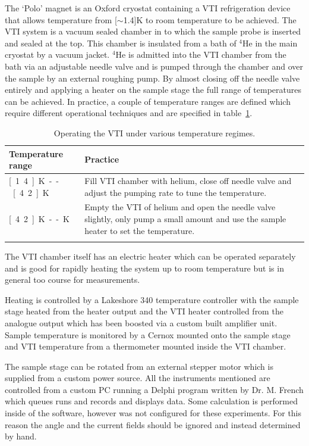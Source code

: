 The `Polo' magnet is an Oxford cryostat containing a \ac{VTI} refrigeration device that allows temperature from \unit[$\sim$1.4]{K} to room temperature to be achieved. The \ac{VTI} system is a vacuum sealed chamber in to which the sample probe is inserted and sealed at the top. This chamber is insulated from a bath of $^4$He in the main cryostat by a vacuum jacket. $^4$He is admitted into the \ac{VTI} chamber from the bath via an adjustable needle valve and is pumped through the chamber and over the sample by an external roughing pump. By almost closing off the needle valve entirely and applying a heater on the sample stage the full range of temperatures can be achieved. In practice, a couple of temperature ranges are defined which require different operational techniques and are specified in table~\ref{Table:Exp:PoloOperation}.
\begin{table}
    \begin{center}
           \caption{Operating the \ac{VTI} under various temperature regimes.}
        \begin{tabular}[htbp]{lp{7cm}}
\toprule
Temperature range & Practice \\
\midrule
\unit[1.4]{K} -- \unit[4.2]{K} & Fill \ac{VTI} chamber with helium, close off needle valve and adjust the pumping rate to tune the temperature. \\
\unit[4.2]{K} -- \unit[300]{K} & Empty the \ac{VTI} of helium and open the needle valve slightly, only pump a small amount and use the sample heater to set the temperature.  \\
\bottomrule
        \label{Table:Exp:PoloOperation}
        \end{tabular}
    \end{center}
\end{table}
The \ac{VTI} chamber itself has an electric heater which can be operated separately and is good for rapidly heating the system up to room temperature but is in general too course for measurements.

Heating is controlled by a Lakeshore 340 temperature controller with the sample stage heated from the heater output and the \ac{VTI} heater controlled from the analogue output which has been boosted via a custom built amplifier unit. Sample temperature is monitored by a Cernox mounted onto the sample stage and \ac{VTI} temperature from a thermometer mounted inside the \ac{VTI} chamber.

The sample stage can be rotated from an external stepper motor which is supplied from a custom power source. All the instruments mentioned are controlled from a custom PC running a Delphi program written by Dr. M. French which queues runs and records and displays data. Some calculation is performed inside of the software, however was not configured for these experiments. For this reason the angle and the current fields should be ignored and instead determined by hand.

